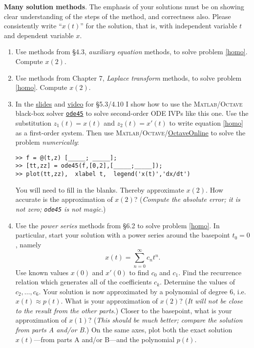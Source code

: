 \documentclass[12pt]{article}
\theoremstyle{definition}
\newcommand{\Matlab}{\textsc{Matlab}\xspace}
\newcommand{\Octave}{\textsc{Octave}\xspace}
\begin{document}
\medskip
\textbf{Many solution methods}.  The emphasis of your solutions must be on showing clear understanding of the steps of the method, and correctness also.  Please consistently write ``$x(t)$'' for the solution, that is, with independent variable $t$ and dependent variable $x$.

\renewcommand{\labelenumi}{\Alph{enumi}.}
\begin{enumerate}
\item Use methods from \S4.3, \emph{auxiliary equation} methods, to solve problem \eqref{homo}.  Compute $x(2)$.
\item Use methods from Chapter 7, \emph{Laplace transform} methods, to solve problem \eqref{homo}.  Compute $x(2)$.
\item In the \href{https://bueler.github.io/math302/assets/slides/5-3.pdf}{slides} and \href{https://expl.ai/VSJTFRC}{video} for \S5.3/4.10 I show how to use the \Matlab/\Octave black-box solver \href{https://www.mathworks.com/help/matlab/ref/ode45.html}{\texttt{ode45}} to solve second-order ODE IVPs like this one.  Use the substitution $z_1(t)=x(t)$ and $z_2(t)=x'(t)$ to write equation \eqref{homo} as a first-order system.  Then use \Matlab/\Octave/\href{https://octave-online.net/}{OctaveOnline} to solve the problem \emph{numerically}:
\begin{Verbatim}[fontsize=\small]
>> f = @(t,z) [_____; _____];
>> [tt,zz] = ode45(f,[0,2],[_____;_____]);
>> plot(tt,zz),  xlabel t,  legend('x(t)','dx/dt')
\end{Verbatim}
You will need to fill in the blanks.  Thereby approximate $x(2)$.  How accurate is the approximation of $x(2)$?  (\emph{Compute the absolute error; it is \emph{not} zero; \emph{\texttt{ode45}} is \emph{not} magic.})
\item Use the \emph{power series} methods from \S6.2 to solve problem \eqref{homo}.  In particular, start your solution with a power series around the basepoint $t_0=0$, namely
    $$x(t) = \sum_{n=0}^\infty c_n t^n.$$
Use known values $x(0)$ and $x'(0)$ to find $c_0$ and $c_1$.  Find the recurrence relation which generates all of the coefficients $c_k$.  Determine the values of $c_2,\dots,c_6$.  Your solution is now approximated by a polynomial of degree 6, i.e.~$x(t)\approx p(t)$.  What is your approximation of $x(2)$?  (\emph{It will not be close to the result from the other parts.})  Closer to the basepoint, what is your approximation of $x(1)$?  (\emph{This should be much better; compare the solution from parts A and/or B.})  On the same axes, plot both the exact solution $x(t)$---from parts A and/or B---and the polynomial $p(t)$.

\end{enumerate}
\end{document}
